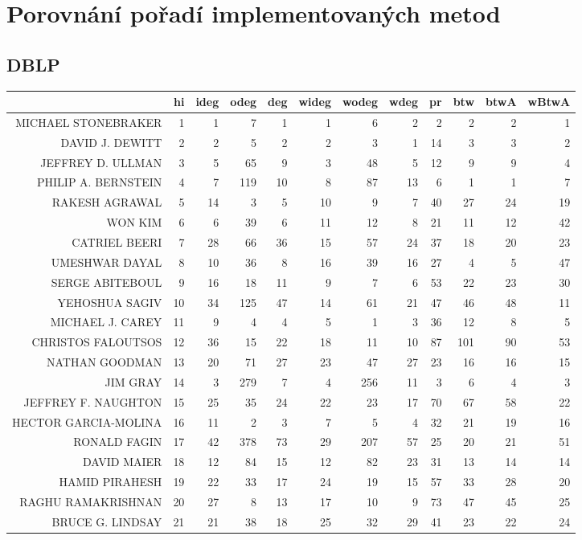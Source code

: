 \documentclass{bakalarka}
\begin{document}
\newpage
\chapter{Porovnání pořadí implementovaných metod}
\label{chapter:porovnani}
\section{DBLP}
\begin{table}[!ht]
\centering
\begin{sideways}
\begin{scriptsize}
\begin{tabular}{r|r|rrrrrrrrrr}
\toprule
&hi&ideg&odeg&deg&wideg&wodeg&wdeg&pr&btw&btwA&wBtwA\\
\midrule
MICHAEL STONEBRAKER&1&1&7&1&1&6&2&2&2&2&1\\
DAVID J. DEWITT&2&2&5&2&2&3&1&14&3&3&2\\
JEFFREY D. ULLMAN&3&5&65&9&3&48&5&12&9&9&4\\
PHILIP A. BERNSTEIN&4&7&119&10&8&87&13&6&1&1&7\\
RAKESH AGRAWAL&5&14&3&5&10&9&7&40&27&24&19\\
WON KIM&6&6&39&6&11&12&8&21&11&12&42\\
CATRIEL BEERI&7&28&66&36&15&57&24&37&18&20&23\\
UMESHWAR DAYAL&8&10&36&8&16&39&16&27&4&5&47\\
SERGE ABITEBOUL&9&16&18&11&9&7&6&53&22&23&30\\
YEHOSHUA SAGIV&10&34&125&47&14&61&21&47&46&48&11\\
MICHAEL J. CAREY&11&9&4&4&5&1&3&36&12&8&5\\
CHRISTOS FALOUTSOS&12&36&15&22&18&11&10&87&101&90&53\\
NATHAN GOODMAN&13&20&71&27&23&47&27&23&16&16&15\\
JIM GRAY&14&3&279&7&4&256&11&3&6&4&3\\
JEFFREY F. NAUGHTON&15&25&35&24&22&23&17&70&67&58&22\\
HECTOR GARCIA-MOLINA&16&11&2&3&7&5&4&32&21&19&16\\
RONALD FAGIN&17&42&378&73&29&207&57&25&20&21&51\\
DAVID MAIER&18&12&84&15&12&82&23&31&13&14&14\\
HAMID PIRAHESH&19&22&33&17&24&19&15&57&33&28&20\\
RAGHU RAMAKRISHNAN&20&27&8&13&17&10&9&73&47&45&25\\
BRUCE G. LINDSAY&21&21&38&18&25&32&29&41&23&22&24\\

\end{tabular}
\end{scriptsize}
\end{sideways}
\end{table}
\end{document}
